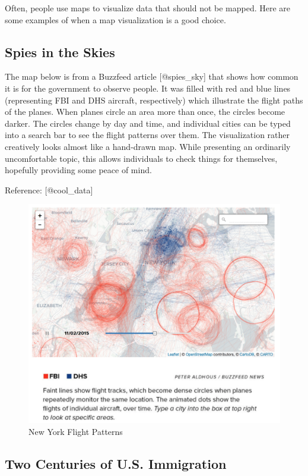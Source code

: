 \documentclass[]{book}
\theoremstyle{definition}
\theoremstyle{definition}
\theoremstyle{definition}
\theoremstyle{remark}
\begin{document}
Often, people use maps to visualize data that should not be mapped. Here
are some examples of when a map visualization is a good choice.

\subsection{Spies in the Skies}\label{spies-in-the-skies}

The map below is from a Buzzfeed article {[}@spies\_sky{]} that shows
how common it is for the government to observe people. It was filled
with red and blue lines (representing FBI and DHS aircraft,
respectively) which illustrate the flight paths of the planes. When
planes circle an area more than once, the circles become darker. The
circles change by day and time, and individual cities can be typed into
a search bar to see the flight patterns over them. The visualization
rather creatively looks almost like a hand-drawn map. While presenting
an ordinarily uncomfortable topic, this allows individuals to check
things for themselves, hopefully providing some peace of mind.

Reference: {[}@cool\_data{]}

\begin{figure}
\centering
\includegraphics{images/NYCflights.png}
\caption{New York Flight Patterns}
\end{figure}

\subsection{Two Centuries of U.S.
Immigration}\label{two-centuries-of-u.s.-immigration}
\end{document}
